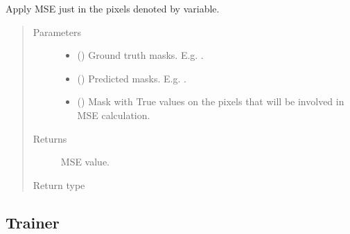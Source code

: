 \documentclass[letterpaper,10pt,english]{sphinxmanual}
\begin{document}
\begin{fulllineitems}
\label{\detokenize{engine/metrics:engine.metrics.masked_mse}}
Apply MSE just in the pixels denoted by  variable.
\begin{quote}\begin{description}
\item[{Parameters}] \leavevmode\begin{itemize}
\item {} 
 () \textendash{} Ground truth masks. E.g. .

\item {} 
 () \textendash{} Predicted masks. E.g. .

\item {} 
 () \textendash{} Mask with True values on the pixels that will be involved in MSE calculation.

\end{itemize}

\item[{Returns}] \leavevmode
{} \textendash{} MSE value.

\item[{Return type}] \leavevmode
{}

\end{description}\end{quote}

\end{fulllineitems}



\subsection{Trainer}
\label{\detokenize{engine/trainer:module-engine.trainer}}\label{\detokenize{engine/trainer:trainer}}\label{\detokenize{engine/trainer::doc}}
\end{document}
